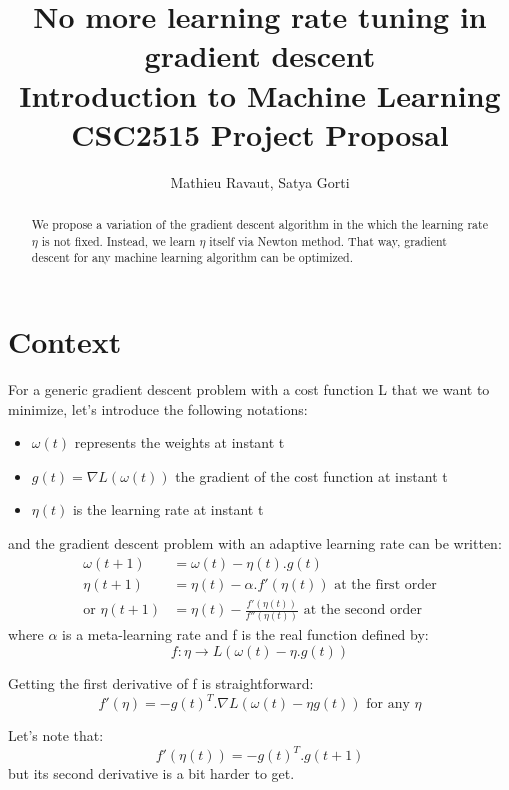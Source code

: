 \documentclass[]{article}
\title{No more learning rate tuning in gradient descent \\
\small{Introduction to Machine Learning CSC2515 Project Proposal}}
\author{Mathieu Ravaut, Satya Gorti}
\begin{document}
\maketitle

\begin{abstract}
	
We propose a variation of the gradient descent algorithm in the which the learning rate $\eta$ is not fixed. Instead, we learn $\eta$ itself via Newton method. That way, gradient descent for any machine learning algorithm can be optimized. 

\end{abstract}

\section{Context}

For a generic gradient descent problem with a cost function L that we want to minimize, let's introduce the following notations:\\
\begin{itemize}
\item $\omega(t)$ represents the weights at instant t
\item $g(t) = \nabla L(\omega(t))$ the gradient of the cost function at instant t
\item $\eta(t)$ is the learning rate at instant t
\end{itemize}
and the gradient descent problem with an adaptive learning rate can be written:\\
\begin{align}
\omega(t+1) &= \omega(t) - \eta(t).g(t)\\
\eta(t+1) &= \eta(t) - \alpha.f'(\eta(t)) \text{ at the first order}\\
\text{or } \eta(t+1) &= \eta(t) - \frac{f'(\eta(t))}{f''(\eta(t))} \text{ at the second order}
\end{align}
where $\alpha$ is a meta-learning rate and f is the real function defined by:\\
$$f: \eta \rightarrow L(\omega(t) - \eta.g(t))$$

Getting the first derivative of f is straightforward:\\
\begin{equation}
f'(\eta) = -g(t)^{T}.\nabla L(\omega(t)-\eta g(t)) \text{ for any $\eta$}
\end{equation}

Let's note that:\\
\begin{equation}
f'(\eta(t)) = -g(t)^{T}.g(t+1)
\end{equation}
but its second derivative is a bit harder to get. 
\end{document}
